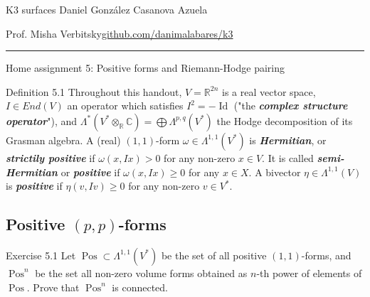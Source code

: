 

\usepackage[style=authortitle-terse,backend=bibtex]{biblatex}


\setcounter{secnumdepth}{2}



\begin{minipage}{\textwidth}
	\begin{minipage}{1\textwidth}
		K3 surfaces \hfill Daniel González Casanova Azuela
		
		{\small Prof. Misha Verbitsky\hfill\href{https://github.com/danimalabares/k3}{github.com/danimalabares/k3}}
	\end{minipage}
\end{minipage}\vspace{.2cm}\hrule

\vspace{10pt}
{\huge Home assignment 5: Positive forms and Riemann-Hodge pairing}

\begin{thing4}{Definition 5.1}\leavevmode
	Throughout this handout, $V=\mathbb{R}^{2n}$ is a real vector space, $I\in End(V)$ an operator which satisfies $I^2=-\operatorname{Id}$ ("the \textit{\textbf{complex structure operator}}"), and $\Lambda^{*}(V^*\otimes_\mathbb{R}\mathbb{C}) =\bigoplus \Lambda^{p,q}(V^*) $ the Hodge decomposition of its Grasman algebra. A (real) $(1,1)$-form $ \omega\in\Lambda^{1,1}(V^*)$ is \textit{\textbf{Hermitian}}, or \textit{\textbf{strictily positive}} if $\omega(x,Ix)>0$ for any non-zero  $x\in V$. It is called \textit{\textbf{semi-Hermitian}} or  \textit{\textbf{positive}} if  $\omega(x,Ix)\geq 0$ for any $x\in X$. A bivector $\eta\in\Lambda^{1,1}(V)$ is \textit{\textbf{positive}} if $\eta(v,Iv)\geq 0$ for any non-zero $v\in V^*$.
\end{thing4}

\setcounter{section}{4}
\subsection{Positive $(p,p)$-forms}

\begin{thing13}{Exercise 5.1}\leavevmode
	Let $\operatorname{Pos}\subset \Lambda^{1,1}(V^*)$ be the set of all positive $(1,1)$-forms, and $\operatorname{Pos}^n$ be the set all non-zero volume forms obtained as $n$-th power of elements of $\operatorname{Pos}$. Prove that $\operatorname{Pos}^n$ is connected.
\end{thing13}

